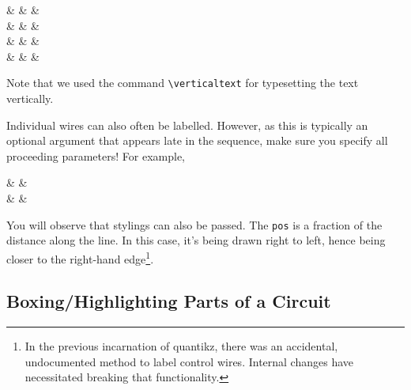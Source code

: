 \documentclass[aps,pra,10pt,nofootinbib]{revtex4-2}
\begin{document}
\begin{Code}
  \begin{quantikz}
     &  & & \\
     &  &   & \\
     &  &  &  \\
     &  &  &
  \end{quantikz}
\end{Code}
Note that we used the command \verb!\verticaltext! for typesetting the text vertically.


Individual wires can also often be labelled. However, as this is typically an optional argument that appears late in the sequence, make sure you specify all proceeding parameters! For example,
\begin{Code}
  \begin{quantikz}
    &  &  \\
    & \targ{} &
  \end{quantikz}
\end{Code}
You will observe that stylings can also be passed. The \texttt{pos} is a fraction of the distance along the line. In this case, it's being drawn right to left, hence being closer to the right-hand edge\footnote{In the previous incarnation of quantikz, there was an accidental, undocumented method to label control wires. Internal changes have necessitated breaking that functionality.}.

\subsection{Boxing/Highlighting Parts of a Circuit}\label{sec:boxing}
\end{document}
